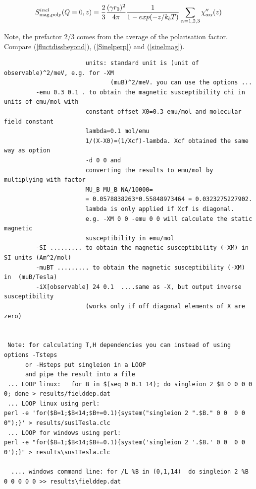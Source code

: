 \begin{description}
\begin{equation}\label{Smagpoly}
S_{\rm mag,poly}^{inel}(Q=0,z)=  \frac{2}{3}\frac{(\gamma r_0)^2}{4\pi} \frac{1}{1-exp(- z/k_bT)}     \sum_{\alpha=1,2,3}\chi''_{\alpha\alpha}(z)
\end{equation}

Note, the prefactor $2/3$ comes
from the average of the polarisation factor. 
Compare (\ref{fluctdissbeyond}), (\ref{Sinelperp}) and (\ref{sinelmag}). 

\begin{verbatim}
                       units: standard unit is (unit of observable)^2/meV, e.g. for -XM
                              (muB)^2/meV. you can use the options ... 
         -emu 0.3 0.1 . to obtain the magnetic susceptibility chi in units of emu/mol with
                       constant offset X0=0.3 emu/mol and molecular field constant 
                       lambda=0.1 mol/emu
                       1/(X-X0)=(1/Xcf)-lambda. Xcf obtained the same way as option 
                       -d 0 0 and
                       converting the results to emu/mol by multiplying with factor
                       MU_B MU_B NA/10000=
                       = 0.0578838263*0.55848973464 = 0.0323275227902. 
                       lambda is only applied if Xcf is diagonal.
                       e.g. -XM 0 0 -emu 0 0 will calculate the static magnetic 
                       susceptibility in emu/mol
         -SI ......... to obtain the magnetic susceptibility (-XM) in SI units (Am^2/mol)
         -muBT ......... to obtain the magnetic susceptibility (-XM) in  (muB/Tesla)
         -iX[observable] 24 0.1  ....same as -X, but output inverse susceptibility
                       (works only if off diagonal elements of X are zero)


 Note: for calculating T,H dependencies you can instead of using options -Tsteps 
      or -Hsteps put singleion in a LOOP
      and pipe the result into a file
 ... LOOP linux:   for B in $(seq 0 0.1 14); do singleion 2 $B 0 0 0 0 0; done > results/fielddep.dat
 ... LOOP linux using perl:
perl -e 'for($B=1;$B<14;$B+=0.1){system("singleion 2 ".$B." 0 0  0 0 0");}' > results/sus1Tesla.clc 
 ... LOOP for windows using perl:
perl -e "for($B=1;$B<14;$B+=0.1){system('singleion 2 '.$B.' 0 0  0 0 0');}" > results\sus1Tesla.clc

  .... windows command line: for /L %B in (0,1,14)  do singleion 2 %B 0 0 0 0 0 >> results\fielddep.dat


\end{verbatim}
\end{description}
